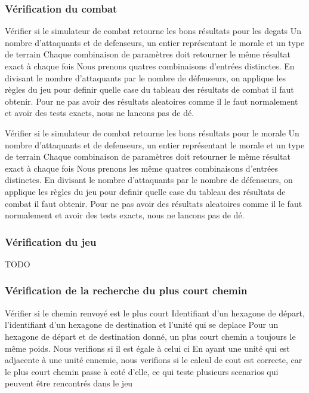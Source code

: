 \subsubsection{Vérification du combat}

\mytest
{Vérifier si le simulateur de combat retourne les bons résultats pour les degats}
{Un nombre d'attaquants et de defenseurs, un entier représentant le morale et un type de terrain}
{Chaque combinaison de paramètres doit retourner le même résultat exact à chaque fois}
{Nous prenons quatres combinaisons d'entrées distinctes.
    En divisant le nombre d'attaquants par le nombre de défenseurs, on applique les règles du jeu pour definir
    quelle case du tableau des résultats de combat il faut obtenir. Pour ne pas avoir des résultats aleatoires comme
    il le faut normalement et avoir des tests exacts, nous ne lancons pas de dé.}

\mytest
{Vérifier si le simulateur de combat retourne les bons résultats pour le morale}
{Un nombre d'attaquants et de defenseurs, un entier représentant le morale et un type de terrain}
{Chaque combinaison de paramètres doit retourner le même résultat exact à chaque fois}
{Nous prenons les même quatres combinaisons d'entrées distinctes.
    En divisant le nombre d'attaquants par le nombre de défenseurs, on applique les règles du jeu pour definir
    quelle case du tableau des résultats de combat il faut obtenir. Pour ne pas avoir des résultats aleatoires comme
    il le faut normalement et avoir des tests exacts, nous ne lancons pas de dé.}


\subsubsection{Vérification du jeu}

TODO

\subsubsection{Vérification de la recherche du plus court chemin}

\mytest
{Vérifier si le chemin renvoyé est le plus court}
{Identifiant d'un hexagone de départ, l'identifiant d'un hexagone de destination et l'unité qui se deplace}
{Pour un hexagone de départ et de destination donné, un plus court chemin a toujours le même poids. Nous verifions
    si il est égale à celui ci}
{En ayant une unité qui est adjacente à une unité ennemie, nous verifions si le calcul de cout est correcte, car
    le plus court chemin passe à coté d'elle, ce qui teste plusieurs scenarios qui peuvent être rencontrés dans le jeu}

